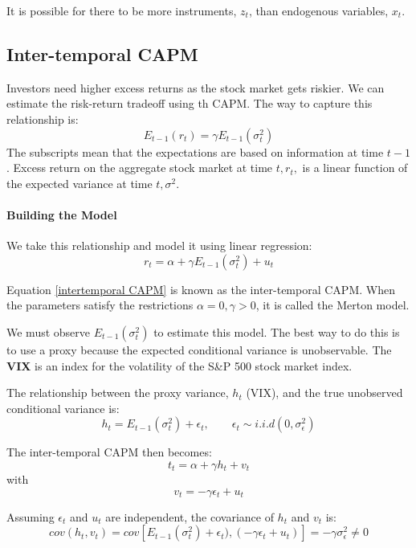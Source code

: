 \documentclass[11pt]{article}
\begin{document}
\begin{note}
    It is possible for there to be more instruments, $z_t$, than endogenous variables, $x_t$.
\end{note}

\subsection{Inter-temporal CAPM}

Investors need higher excess returns as the stock market gets riskier. We can estimate the risk-return tradeoff using th CAPM. The way to capture this relationship is:
\[E_{t-1}(r_t) = \gamma E_{t-1}(\sigma^2_t)\]
The subscripts mean that the expectations are based on information at time $t-1$. Excess return on the aggregate stock market at time $t, r_t,$ is a linear function of the expected variance at time $t, \sigma^2$.

\paragraph{Building the Model}

We take this relationship and model it using linear regression:
\begin{equation}
    \label{intertemporal CAPM}
    r_t = \alpha + \gamma E_{t-1}(\sigma^2_t) + u_t
\end{equation}

Equation \eqref{intertemporal CAPM} is known as the inter-temporal CAPM. When the parameters satisfy the restrictions $\alpha=0,\gamma>0$, it is called the Merton model.

We must observe $E_{t-1}(\sigma_t^2)$ to estimate this model. The best way to do this is to use a proxy because the expected conditional variance is unobservable. The \textbf{VIX} is an index for the volatility of the S\&P 500 stock market index.

The relationship between the proxy variance, $h_t$ (VIX), and the true unobserved conditional variance is:
\[h_t = E_{t-1}(\sigma_t^2) + \epsilon_t, \qquad \epsilon_t \sim i.i.d(0,\sigma_\epsilon^2)\]

The inter-temporal CAPM then becomes:
\[t_t = \alpha+ \gamma h_t + v_t\]
with \[v_t = -\gamma \epsilon_t + u_t\]

Assuming $\epsilon_t$ and $u_t$ are independent, the covariance of $h_t$ and $v_t$ is:
\[cov(h_t,v_t) = cov[E_{t-1}(\sigma_t^2) + \epsilon_t),(-\gamma \epsilon_t + u_t)] = -\gamma \sigma_\epsilon^2 \neq 0\]
\end{document}
